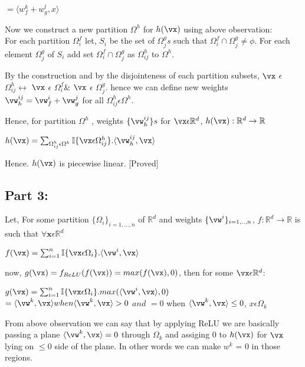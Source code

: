 \documentclass[a4paper,11pt]{article}
\begin{document}
\begin{mlsolution}
\begin{center}
$=\langle w^k_f+w^l_g,x \rangle$
\end{center}
Now we construct a new partition $\Omega^h$ for $h(\vx)$ using above observation:\\
For each partition $\Omega_i^f$ let, $S_i$ be the set of $\Omega_j^gs$ such that $\Omega_i^f \cap \Omega_j^g \neq \phi$. For each element $\Omega_j^g$ of $S_i$ add set $\Omega_i^f \cap \Omega_j^g $ as $\Omega_{ij}^h$ to $\Omega^h$. 

By the construction and by the disjointeness of each partition subsets, $\vx$ $\epsilon$ $\Omega_{ij}^h \leftrightarrow$ $\vx$ $\epsilon$ $\Omega_{i}^f \& $  $\vx$ $\epsilon$ $\Omega_{j}^g$. hence we can define new weights $\vw_h^{ij} = \vw_f^i + \vw_g^j$ for all $\Omega^h_{ij} \epsilon \Omega^h$.

Hence, for partition $\Omega^h$ , weights $\{\vw_h^{ij}\}s$ for $\vx \epsilon \mathbb{R}^d$, $h(\vx):\mathbb{R}^d \rightarrow \mathbb{R}$
\begin{center}
$h(\vx) = \sum_{\Omega_{ij}^h\epsilon\Omega^h}\mathbb{I}\{\vx \epsilon \Omega_{ij}^h \}.\langle \vw^{ij}_h,\vx\rangle$
\end{center}
Hence. $h(\vx)$ is piecewise linear. [Proved] 
\newpage
\subsection*{Part 3:}
Let, For some partition $\{\Omega_i\}_{i=1,...,n}$ of $\mathbb{R}^d$ and weights $\{\vw^i\}_{i=1,..,n}$, $f:\mathbb{R}^d \rightarrow \mathbb{R}$ is such that $\forall \mathbf{x} \epsilon \mathbb{R}^d$
\begin{center}
$f(\vx) = \sum_{i=1}^{n}\mathbb{I}\{\vx \epsilon \Omega_i \}.\langle \vw^i,\vx\rangle$
\end{center}
now, $g(\vx) = f_{ReLU}(f(\vx)) = max(f(\vx),0)$, then for some $\vx \epsilon \mathbb{R}^d$:
\begin{center}
$g(\vx) = \sum_{i=1}^{n}\mathbb{I}\{\vx \epsilon \Omega_i \}.max(\langle \vw^i,\vx\rangle,0)$\\

$= \langle \vw^k,\vx\rangle when \langle \vw^k,\vx\rangle > 0$ $and $ $= 0$ when $\langle \vw^k,\vx\rangle \leq 0 $, $x \epsilon \Omega_k$
\end{center} 

From above observation we can say that by applying ReLU we are basically passing a plane $\langle \vw^k,\vx\rangle = 0$ through $\Omega_k$ and assiging 0 to $h(\vx)$ for $\vx$ lying on $\leq 0 $ side of the plane. In other words we can make $w^k$ = 0 in those regions.


\end{mlsolution}
\end{document}

